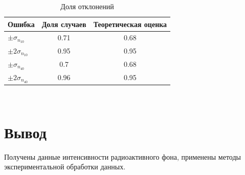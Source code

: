 \begin{table}
    \centering
    \caption{Доля отклонений}
    \begin{tabular}{|l|c|c|}
    \hline
    Ошибка                 & Доля случаев & Теоретическая оценка \\ \hline
    $\pm\sigma_{n_{10}}$   & 0.71         & 0.68                 \\ \hline
    $\pm 2\sigma_{n_{10}}$ & 0.95         & 0.95                 \\ \hline
    $\pm\sigma_{n_{40}}$   & 0.7          & 0.68                 \\ \hline
    $\pm 2\sigma_{n_{40}}$ & 0.96         & 0.95                 \\ \hline
    \end{tabular}
    \label{table:4}
\end{table}

\newpage
~
\newpage

\section{Вывод}
Получены данные интенсивности радиоактивного фона, применены методы экспериментальной обработки данных.
